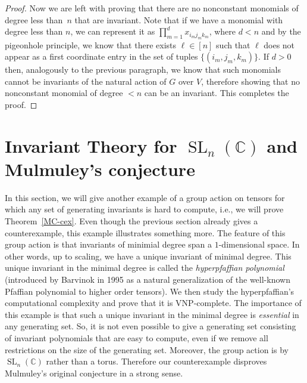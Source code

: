 \documentclass[10pt,a4paper]{article}
\newcommand{\C}{\mathbb C}
\newcommand{\SL}{\operatorname{SL}}
\begin{document}
\begin{proof}
	Now we are left with proving that there are no nonconstant monomials of degree less than~$n$ that are invariant.
  Note that if we have a monomial with degree less than $n$, we can represent it as
	$\prod_{m=1}^d x_{i_m j_m k_m}$, where $d < n$ and by the pigeonhole principle, we know that
	there exists $\ell \in [n]$ such that $\ell$ does not appear as a first coordinate entry in
	the set of tuples $\{(i_m, j_m, k_m)\}$. If $d>0$ then, analogously to the previous paragraph, we know
	that such monomials cannot be invariants of the natural action of $G$ over $V$, therefore showing
	that no nonconstant monomial of degree $< n$ can be an invariant. This completes the proof.
\end{proof}






\section{Invariant Theory for \texorpdfstring{$\SL_n(\C)$}{SL\_n(C)} and Mulmuley's conjecture} \label{Sec:Ketan}

%

In this section, we will give another example of a group action on tensors for which any set of generating invariants is hard to compute, i.e., we will prove Theorem~\ref{MC-cex}. Even though the previous section already gives a counterexample, this example illustrates something more. The feature of this group action is that invariants of minimial degree span a $1$-dimensional space. In other words, up to scaling, we have a unique invariant of minimal degree. This unique invariant in the minimal degree is called the \emph{hyperpfaffian polynomial} (introduced by Barvinok in 1995 as a natural generalization of the well-known Pfaffian polynomial to higher order tensors). We then study the hyperpfaffian's computational complexity and prove that it is VNP-complete. The importance of this example is that such a unique invariant in the minimal degree is {\em essential} in any generating set. So, it is not even possible to give a generating set consisting of invariant polynomials that are easy to compute, even if we remove all restrictions on the size of the generating set.
Moreover, the group action is by $\SL_n(\C)$ rather than a torus.
Therefore our counterexample disproves Mulmuley's original conjecture in a strong sense.
%

%
%
%


%
\end{document}
